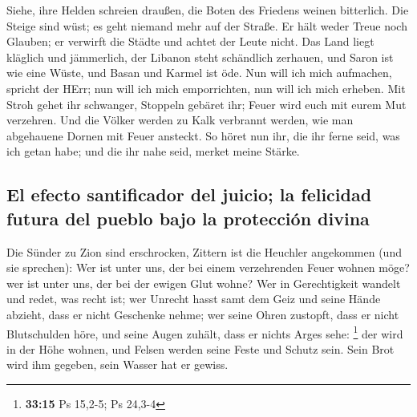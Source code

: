  Siehe, ihre Helden schreien draußen, die Boten des
Friedens weinen bitterlich.  Die Steige sind wüst; es geht
niemand mehr auf der Straße. Er hält weder Treue noch Glauben; er
verwirft die Städte und achtet der Leute nicht.  Das Land
liegt kläglich und jämmerlich, der Libanon steht schändlich zerhauen,
und Saron ist wie eine Wüste, und Basan und Karmel ist öde.
 Nun will ich mich aufmachen, spricht der HErr; nun will
ich mich emporrichten, nun will ich mich erheben.  Mit
Stroh gehet ihr schwanger, Stoppeln gebäret ihr; Feuer wird euch mit
eurem Mut verzehren.  Und die Völker werden zu Kalk
verbrannt werden, wie man abgehauene Dornen mit Feuer ansteckt.
 So höret nun ihr, die ihr ferne seid, was ich getan
habe; und die ihr nahe seid, merket meine Stärke.

\hypertarget{el-efecto-santificador-del-juicio-la-felicidad-futura-del-pueblo-bajo-la-protecciuxf3n-divina}{%
\subsection{El efecto santificador del juicio; la felicidad futura del
pueblo bajo la protección
divina}\label{el-efecto-santificador-del-juicio-la-felicidad-futura-del-pueblo-bajo-la-protecciuxf3n-divina}}

 Die Sünder zu Zion sind erschrocken, Zittern ist die
Heuchler angekommen (und sie sprechen): Wer ist unter uns, der bei einem
verzehrenden Feuer wohnen möge? wer ist unter uns, der bei der ewigen
Glut wohne?  Wer in Gerechtigkeit wandelt und redet, was
recht ist; wer Unrecht hasst samt dem Geiz und seine Hände abzieht, dass
er nicht Geschenke nehme; wer seine Ohren zustopft, dass er nicht
Blutschulden höre, und seine Augen zuhält, dass er nichts Arges sehe:
\footnote{\textbf{33:15} Ps 15,2-5; Ps 24,3-4}  der wird
in der Höhe wohnen, und Felsen werden seine Feste und Schutz sein. Sein
Brot wird ihm gegeben, sein Wasser hat er gewiss.

